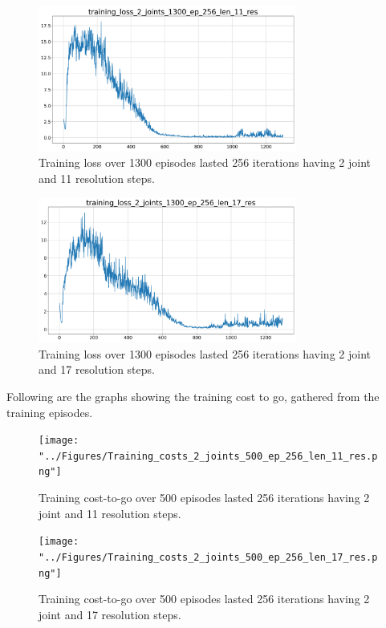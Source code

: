 \documentclass[twocolumn, a4paper]{article}
\begin{document}
\begin{figure}[H]
	\centering
	\includegraphics[width=8.5cm]{"../Figures/training_loss_2J_1300E_256EL_11RES.png"}
	\caption{Training loss over 1300 episodes lasted 256 iterations having 2
			 joint and 11 resolution steps.}
	\label{fig:TrainLoss_2_1300_11}
\end{figure}

\begin{figure}[H]
	\centering
	\includegraphics[width=8.5cm]{"../Figures/training_loss_2J_1300E_256EL_17RES.png"}
	\caption{Training loss over 1300 episodes lasted 256 iterations having 2
			 joint and 17 resolution steps.}
	\label{fig:TrainLoss_2_1300_17}
\end{figure}

Following are the graphs showing the training cost to go, gathered from the
training episodes.

\begin{figure}[H]
	\centering
	\texttt{[image: "../Figures/Training\_costs\_2\_joints\_500\_ep\_256\_len\_11\_res.png"]}
	\caption{Training cost-to-go over 500 episodes lasted 256 iterations having 2
			 joint and 11 resolution steps.}
	\label{fig:Train_cost_to_go_2_500_11}
\end{figure}

\begin{figure}[H]
	\centering
	\texttt{[image: "../Figures/Training\_costs\_2\_joints\_500\_ep\_256\_len\_17\_res.png"]}
	\caption{Training cost-to-go over 500 episodes lasted 256 iterations having 2
			 joint and 17 resolution steps.}
	\label{fig:Train_cost_to_go_2_500_17}
\end{figure}
\end{document}
